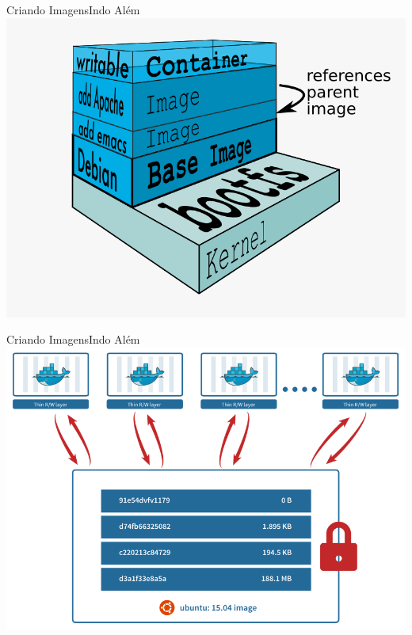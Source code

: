 \documentclass[10pt]{beamer}
\begin{document}
\begin{frame}{Criando Imagens}{Indo Além}
    \centering
    \includegraphics[width=0.8\linewidth]{AAUgraphics/docker_layers.png}
\end{frame}
\begin{frame}{Criando Imagens}{Indo Além}
    \centering
    \includegraphics[width=0.8\linewidth]{AAUgraphics/docker-hash.png}
\end{frame}
\end{document}
